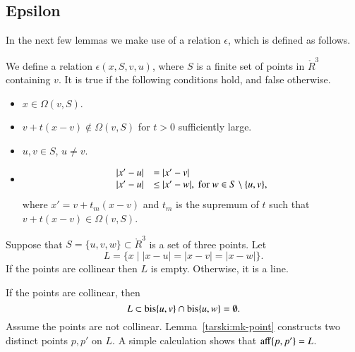 \begin{tarskidata}
\begin{tarski}
\section{Epsilon}
In the next few lemmas we make use of a relation
$\epsilon$, which is defined as follows.
\begin{definition}[$\epsilon$]
We define a relation $\epsilon(x,S,v,u)$, where $S$ is
a finite set of points in $\ring{R}^3$ containing $v$.  It is true if
the following conditions hold, and false otherwise.
\begin{itemize}
 \item $x\in \Omega(v,S)$.
 \item $v + t(x-v)\not\in\Omega(v,S)$ for
$t>0$ sufficiently large.
  \item $u,v\in S$, $u\ne v$.
 \item \begin{equation}\tlabel{fine:eps-test}
     \begin{array}{lll}
   |x'-u| &= |x'-v|\\
   |x'-u| &\le |x'-w|,\text{ for } w\in S\setminus\{u,v\},
   \end{array}
   \end{equation}
  where $x' = v+t_m (x-v)$ and $t_m$ is the supremum of $t$
  such that $v+t(x-v)\in\Omega(v,S)$.
\end{itemize}
\end{definition}
\end{tarski}

\begin{tarski}

\begin{lemma}
Suppose that $S=\{u,v,w\}\subset \ring{R}^3$ is a set of three points.
Let 
$$
L = \{x \mid |x-u| = |x-v| = |x-w|\}.
$$
If the points are collinear then $L$ is empty.  Otherwise, it is a line.
\end{lemma}

\begin{proved} 
If the points are collinear, then
$$
L\subset {\operatorname{bis}}\{u,v\} \cap {\operatorname{bis}}\{u,w\}=\emptyset.
$$
Assume the points are not collinear.  
Lemma~\ref{tarski:mk-point} constructs two distinct points $p,p'$ on $L$. 
A simple calculation shows
that ${\operatorname{aff}}\{p,p'\}=L$. 
\swallowed\end{proved}
\end{tarski}


\end{tarskidata}
